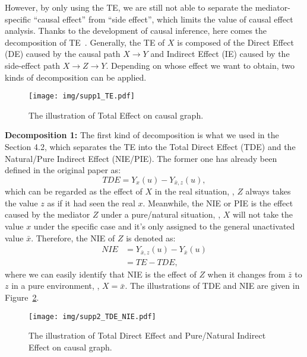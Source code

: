 \documentclass[10pt,twocolumn,letterpaper]{article}
\begin{document}
However, by only using the TE, we are still not able to separate the mediator-specific ``causal effect'' from ``side effect'', which limits the value of causal effect analysis. Thanks to the development of causal inference, here comes the decomposition of TE~\cite{pearl2001direct, vanderweele2013three}. Generally, the TE of $X$ is composed of the Direct Effect (DE) caused by the causal path $X\to Y$ and Indirect Effect (IE) caused by the side-effect path $X\to Z\to Y$. Depending on whose effect we want to obtain, two kinds of decomposition can be applied. 


\begin{figure}[t!]
   \begin{minipage}[b]{1\linewidth}
   \centerline{\texttt{[image: img/supp1\_TE.pdf]}}
   \end{minipage}
   \caption{The illustration of Total Effect on causal graph.}
   \label{supp_fig:te} \end{figure}


\noindent\textbf{Decomposition 1:} The first kind of decomposition is what we used in the Section 4.2, which separates the TE into the Total Direct Effect (TDE) and the Natural/Pure Indirect Effect (NIE/PIE). The former one has already been defined in the original paper as:
\begin{equation}
    TDE=Y_x(u)-Y_{\bar{x}, z}(u),
\end{equation}
which can be regarded as the effect of $X$ in the real situation, \ie, $Z$ always takes the value $z$ as if it had seen the real $x$. Meanwhile, the NIE or PIE is the effect caused by the mediator $Z$ under a pure/natural situation, \ie, $X$ will not take the value $x$ under the specific case and it's only assigned to the general unactivated value $\bar{x}$. Therefore, the NIE of $Z$ is denoted as:
\begin{align}
    NIE &=Y_{\bar{x}, z}(u) - Y_{\bar{x}}(u) \\
        &=TE - TDE,
\end{align}
where we can easily identify that NIE is the effect of $Z$ when it changes from $\bar{z}$ to $z$ in a pure environment, \ie, $X=\bar{x}$. The illustrations of TDE and NIE are given in Figure~\ref{supp_fig:tde_nie}. 

\begin{figure}[t!]
   \begin{minipage}[b]{1\linewidth}
   \centerline{\texttt{[image: img/supp2\_TDE\_NIE.pdf]}}
   \end{minipage}
   \caption{The illustration of Total Direct Effect and Pure/Natural Indirect Effect on causal graph.}
   \label{supp_fig:tde_nie} \end{figure}
\end{document}
